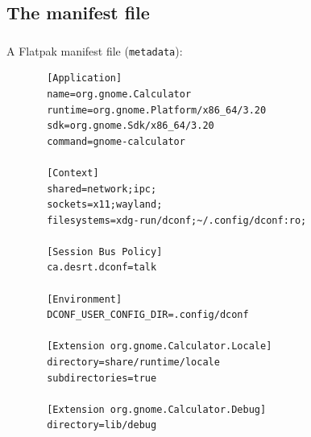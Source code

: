 \subsection{The manifest file}
\begin{frame}[fragile]
  \frametitle{\insertsubsection}

  A Flatpak manifest file (\texttt{metadata}):
    \begin{tiny}
\begin{verbatim}
       [Application]
       name=org.gnome.Calculator
       runtime=org.gnome.Platform/x86_64/3.20
       sdk=org.gnome.Sdk/x86_64/3.20
       command=gnome-calculator

       [Context]
       shared=network;ipc;
       sockets=x11;wayland;
       filesystems=xdg-run/dconf;~/.config/dconf:ro;

       [Session Bus Policy]
       ca.desrt.dconf=talk

       [Environment]
       DCONF_USER_CONFIG_DIR=.config/dconf

       [Extension org.gnome.Calculator.Locale]
       directory=share/runtime/locale
       subdirectories=true

       [Extension org.gnome.Calculator.Debug]
       directory=lib/debug
\end{verbatim}
    \end{tiny}
\end{frame}

